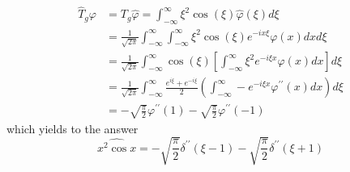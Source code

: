 \documentclass{article}
\begin{document}
\begin{align*}
\hat { T } _ { g } \varphi& = T _ { g } \hat { \varphi } = \int _ { - \infty } ^ { \infty } \xi ^ { 2 } \cos ( \xi ) \hat {\varphi }  ( \xi ) d \xi\\
&= \frac { 1 }{ \sqrt { 2 \pi } } \int _ { - \infty } ^ { \infty } \int _ { - \infty } ^ { \infty } \xi ^ { 2 } \cos ( \xi ) e ^ { - i x \xi } \varphi ( x ) d x d \xi\\
&=\frac { 1 } { \sqrt { 2 \pi } } \int _ { - \infty } ^ { \infty } \cos ( \xi ) \left[ \int _ { - \infty } ^ { \infty } \xi ^ { 2 } e ^ { - i \xi x } \varphi ( x ) d x \right] d \xi\\
&= \frac { 1 } { \sqrt { 2 \pi } } \int _ { - \infty } ^ { \infty } \frac { e ^ { i \xi } + e ^ { - i \xi } } { 2 } \left( \int _ { - \infty } ^ { \infty } - e ^ { - i \xi x } \varphi ^ { \prime \prime } ( x ) d x \right) d \xi\\
&=-\sqrt { \frac { \pi } { 2 } } \varphi ^ { \prime \prime } ( 1 ) - \sqrt { \frac { \pi } { 2 } } \varphi ^ { \prime \prime } ( - 1)
\end{align*}
which yields to the answer
$$ \widehat{x ^ { 2 } \cos x}= - \sqrt { \frac { \pi } { 2 } } \delta ^ { \prime \prime } ( \xi - 1 ) - \sqrt { \frac { \pi } { 2 } } \delta ^ { \prime \prime } ( \xi + 1 )$$
\end{document}

